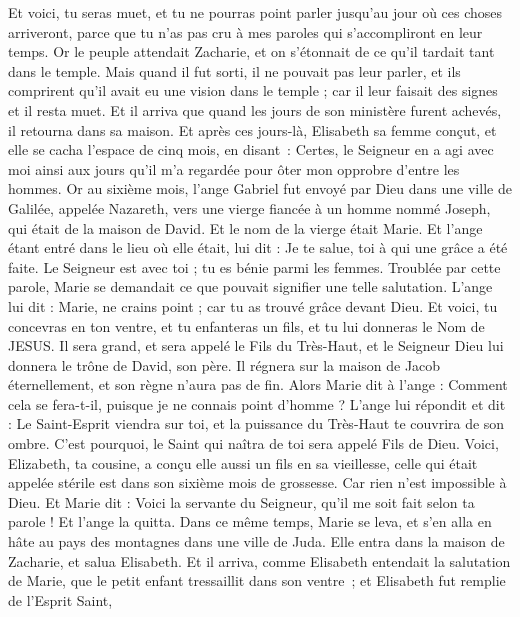 \begin{multicols}{2}
Et voici, tu seras muet, et tu ne pourras point parler jusqu'au jour où ces choses arriveront, parce que tu n'as pas cru à mes paroles qui s'accompliront en leur temps.
Or le peuple attendait Zacharie, et on s'étonnait de ce qu'il tardait tant dans le temple.
Mais quand il fut sorti, il ne pouvait pas leur parler, et ils comprirent qu'il avait eu une vision dans le temple ; car il leur faisait des signes et il resta muet.
Et il arriva que quand les jours de son ministère furent achevés, il retourna dans sa maison.
Et après ces jours-là, Elisabeth sa femme conçut, et elle se cacha l’espace de cinq mois, en disant :
Certes, le Seigneur en a agi avec moi ainsi aux jours qu’il m’a regardée pour ôter mon opprobre d’entre les hommes.
Or au sixième mois, l'ange Gabriel fut envoyé par Dieu dans une ville de Galilée, appelée Nazareth,
vers une vierge fiancée à un homme nommé Joseph, qui était de la maison de David. Et le nom de la vierge était Marie.
Et l'ange étant entré dans le lieu où elle était, lui dit : Je te salue, toi à qui une grâce a été faite. Le Seigneur est avec toi ; tu es bénie parmi les femmes.
Troublée par cette parole, Marie se demandait ce que pouvait signifier une telle salutation.
L'ange lui dit : Marie, ne crains point ; car tu as trouvé grâce devant Dieu.
Et voici, tu concevras en ton ventre, et tu enfanteras un fils, et tu lui donneras le Nom de JESUS.
Il sera grand, et sera appelé le Fils du Très-Haut, et le Seigneur Dieu lui donnera le trône de David, son père.
Il régnera sur la maison de Jacob éternellement, et son règne n'aura pas de fin.
Alors Marie dit à l'ange : Comment cela se fera-t-il, puisque je ne connais point d'homme ?
L'ange lui répondit et dit : Le Saint-Esprit viendra sur toi, et la puissance du Très-Haut te couvrira de son ombre. C'est pourquoi, le Saint qui naîtra de toi sera appelé Fils de Dieu.
Voici, Elizabeth, ta cousine, a conçu elle aussi un fils en sa vieillesse, celle qui était appelée stérile est dans son sixième mois de grossesse.
Car rien n'est impossible à Dieu.
Et Marie dit : Voici la servante du Seigneur, qu'il me soit fait selon ta parole ! Et l'ange la quitta.
Dans ce même temps, Marie se leva, et s'en alla en hâte au pays des montagnes dans une ville de Juda.
Elle entra dans la maison de Zacharie, et salua Elisabeth.
Et il arriva, comme Elisabeth entendait la salutation de Marie, que le petit enfant tressaillit dans son ventre ; et Elisabeth fut remplie de l’Esprit Saint,

\end{multicols}
